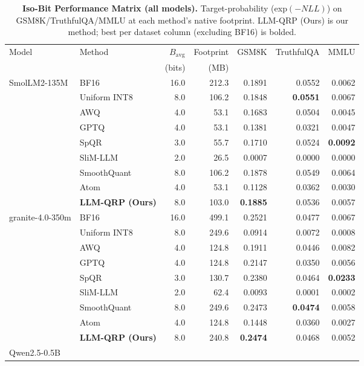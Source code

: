 \begin{table}[htbp]
\centering
\caption{\textbf{Iso-Bit Performance Matrix (all models).} Target-probability (exp$(-NLL)$) on GSM8K/TruthfulQA/MMLU at each method's native footprint. LLM-QRP (Ours) is our method; best per dataset column (excluding BF16) is bolded.}
\label{tab:isobit_all}
\vskip 0.15in
\begin{small}
\begin{sc}
\begin{tabular}{llrrrrr}
\toprule
Model & Method & $B_{\mathrm{avg}}$ & Footprint & GSM8K & TruthfulQA & MMLU \\
 & & (bits) & (MB) & & & \\
\midrule
\multirow{9}{*}{SmolLM2-135M}
 & BF16 & 16.0 & 212.3 & 0.1891 & 0.0552 & 0.0062 \\
 & Uniform INT8 & 8.0 & 106.2 & 0.1848 & \textbf{0.0551} & 0.0067 \\
 & AWQ & 4.0 & 53.1 & 0.1683 & 0.0504 & 0.0045 \\
 & GPTQ & 4.0 & 53.1 & 0.1381 & 0.0321 & 0.0047 \\
 & SpQR & 3.0 & 55.7 & 0.1710 & 0.0524 & \textbf{0.0092} \\
 & SliM-LLM & 2.0 & 26.5 & 0.0007 & 0.0000 & 0.0000 \\
 & SmoothQuant & 8.0 & 106.2 & 0.1878 & 0.0549 & 0.0064 \\
 & Atom & 4.0 & 53.1 & 0.1128 & 0.0362 & 0.0030 \\
 & \textbf{LLM-QRP (Ours)} & 8.0 & 103.0 & \textbf{0.1885} & 0.0536 & 0.0057 \\
\midrule
\multirow{9}{*}{granite-4.0-350m}
 & BF16 & 16.0 & 499.1 & 0.2521 & 0.0477 & 0.0067 \\
 & Uniform INT8 & 8.0 & 249.6 & 0.0914 & 0.0072 & 0.0008 \\
 & AWQ & 4.0 & 124.8 & 0.1911 & 0.0446 & 0.0082 \\
 & GPTQ & 4.0 & 124.8 & 0.2147 & 0.0350 & 0.0056 \\
 & SpQR & 3.0 & 130.7 & 0.2380 & 0.0464 & \textbf{0.0233} \\
 & SliM-LLM & 2.0 & 62.4 & 0.0093 & 0.0001 & 0.0002 \\
 & SmoothQuant & 8.0 & 249.6 & 0.2473 & \textbf{0.0474} & 0.0058 \\
 & Atom & 4.0 & 124.8 & 0.1448 & 0.0360 & 0.0027 \\
 & \textbf{LLM-QRP (Ours)} & 8.0 & 240.8 & \textbf{0.2474} & 0.0468 & 0.0052 \\
\midrule
\multirow{9}{*}{Qwen2.5-0.5B}

\end{tabular}
\end{sc}
\end{small}
\end{table}
